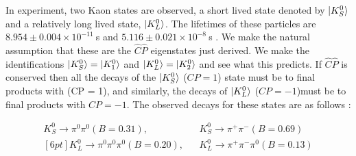 In experiment, two Kaon states are observed, a short lived state denoted by $\ket{K^{0}_{S}}$ and a relatively long lived state, $\ket{K^{0}_{L}}$. The lifetimes of these particles are $8.954 \pm 0.004 \times 10^{−11}~$s and $5.116 \pm 0.021 \times 10^{−8}~$s \cite{PDGliveKaonLifetime}. We make the natural assumption that these are the $\hat{C}\hat{P}$ eigenstates just derived. We make the identifications $\ket{K^{0}_{S}} = \ket{K^{0}_{1}}$ and $\ket{K^{0}_{L}} = \ket{K^{0}_{2}}$ and see what this predicts. If $\hat{C}\hat{P}$ is conserved then all the decays of the $\ket{K^{0}_{S}}$ ($CP = 1$) state must be to final products with (CP = 1), and similarly, the decays of $\ket{K^{0}_{L}}$ ($CP = -1$)must be to final products with $CP = -1$. The observed decays for these states are as follows \cite[pg. 292]{Martin+Shaw}:

\begin{eqnarray*}    
K^{0}_S \rightarrow \pi^0 \pi^0 (B = 0.31),  &   &   K^{0}_{S} \rightarrow \pi^{+} \pi^{-} (B = 0.69)\\ [6pt]
K^{0}_L \rightarrow \pi^0 \pi^0 \pi^0 (B = 0.20),   &   &   K^{0}_{L} \rightarrow \pi^{+}  \pi^{-} \pi^0 (B =0.13)  
\end{eqnarray*}    


